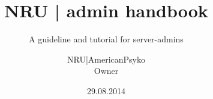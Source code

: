 
\subject{
\vspace{0.4cm}
No0bZ R Us\\
\vspace{1.1cm}
\texttt{[image: images/logo\_large.png]}}
\vspace{1.0cm}

\title{NRU | admin handbook}
\subtitle{A guideline and tutorial for server-admins\vspace{1.4cm}}

\author{NRU|AmericanPsyko \\ Owner \vspace{1.4cm}}

\date{29.08.2014\vspace{1.4cm}}